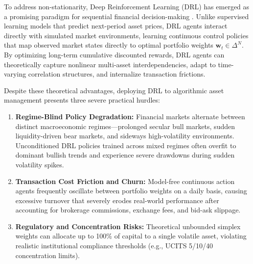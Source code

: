 \documentclass[conference]{IEEEtran}
\begin{document}
To address non-stationarity, Deep Reinforcement Learning (DRL) has emerged as a promising paradigm for sequential financial decision-making \cite{jiang2017deep, liang2018adversarial}. Unlike supervised learning models that predict next-period asset prices, DRL agents interact directly with simulated market environments, learning continuous control policies that map observed market states directly to optimal portfolio weights $\mathbf{w}_t \in \Delta^N$. By optimizing long-term cumulative discounted rewards, DRL agents can theoretically capture nonlinear multi-asset interdependencies, adapt to time-varying correlation structures, and internalize transaction frictions.

Despite these theoretical advantages, deploying DRL to algorithmic asset management presents three severe practical hurdles:
\begin{enumerate}
    \item \textbf{Regime-Blind Policy Degradation:} Financial markets alternate between distinct macroeconomic regimes---prolonged secular bull markets, sudden liquidity-driven bear markets, and sideways high-volatility environments. Unconditioned DRL policies trained across mixed regimes often overfit to dominant bullish trends and experience severe drawdowns during sudden volatility spikes.
    \item \textbf{Transaction Cost Friction and Churn:} Model-free continuous action agents frequently oscillate between portfolio weights on a daily basis, causing excessive turnover that severely erodes real-world performance after accounting for brokerage commissions, exchange fees, and bid-ask slippage.
    \item \textbf{Regulatory and Concentration Risks:} Theoretical unbounded simplex weights can allocate up to 100\% of capital to a single volatile asset, violating realistic institutional compliance thresholds (e.g., UCITS 5/10/40 concentration limits).
\end{enumerate}
\end{document}
